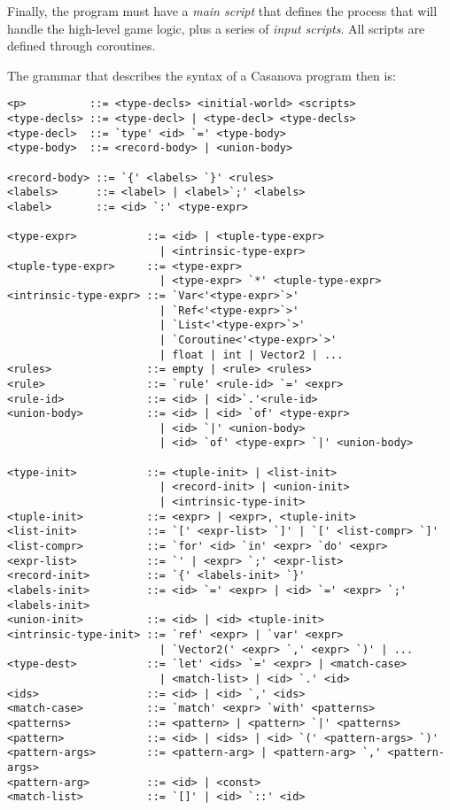 Finally, the program must have a \textit{main script} that defines the process that will handle the high-level game logic, plus a series of \textit{input scripts}. All scripts are defined through coroutines.

The grammar that describes the syntax of a Casanova program then is:

\begin{lstlisting}[texcl]
<p>          ::= <type-decls> <initial-world> <scripts>
<type-decls> ::= <type-decl> | <type-decl> <type-decls>
<type-decl>  ::= `type' <id> `=' <type-body>
<type-body>  ::= <record-body> | <union-body>

<record-body> ::= `{' <labels> `}' <rules>
<labels>      ::= <label> | <label>`;' <labels>
<label>       ::= <id> `:' <type-expr>

<type-expr>           ::= <id> | <tuple-type-expr> 
                        | <intrinsic-type-expr>
<tuple-type-expr>     ::= <type-expr> 
                        | <type-expr> `*' <tuple-type-expr>
<intrinsic-type-expr> ::= `Var<'<type-expr>`>' 
                        | `Ref<'<type-expr>`>' 
                        | `List<'<type-expr>`>' 
                        | `Coroutine<'<type-expr>`>' 
                        | float | int | Vector2 | ...
<rules>               ::= empty | <rule> <rules>
<rule>                ::= `rule' <rule-id> `=' <expr>
<rule-id>             ::= <id> | <id>`.'<rule-id>
<union-body>          ::= <id> | <id> `of' <type-expr> 
                        | <id> `|' <union-body> 
                        | <id> `of' <type-expr> `|' <union-body>

<type-init>           ::= <tuple-init> | <list-init> 
                        | <record-init> | <union-init> 
                        | <intrinsic-type-init>
<tuple-init>          ::= <expr> | <expr>, <tuple-init>
<list-init>           ::= `[' <expr-list> `]' | `[' <list-compr> `]'
<list-compr>          ::= `for' <id> `in' <expr> `do' <expr>
<expr-list>           ::= `' | <expr> `;' <expr-list>
<record-init>         ::= `{' <labels-init> `}'
<labels-init>         ::= <id> `=' <expr> | <id> `=' <expr> `;' <labels-init>
<union-init>          ::= <id> | <id> <tuple-init>
<intrinsic-type-init> ::= `ref' <expr> | `var' <expr> 
                        | `Vector2(' <expr> `,' <expr> `)' | ...
<type-dest>           ::= `let' <ids> `=' <expr> | <match-case> 
                        | <match-list> | <id> `.' <id>
<ids>                 ::= <id> | <id> `,' <ids>
<match-case>          ::= `match' <expr> `with' <patterns>
<patterns>            ::= <pattern> | <pattern> `|' <patterns>
<pattern>             ::= <id> | <ids> | <id> `(' <pattern-args> `)'
<pattern-args>        ::= <pattern-arg> | <pattern-arg> `,' <pattern-args>
<pattern-arg>         ::= <id> | <const>
<match-list>          ::= `[]' | <id> `::' <id>


\end{lstlisting}
